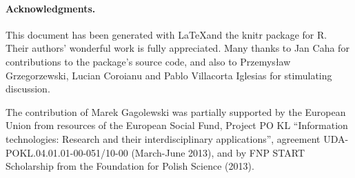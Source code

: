 \documentclass[11pt]{article}\usepackage[]{graphicx}\usepackage[]{color}
\newcommand{\package}[1]{\textsf{#1}\xspace}
\newcommand{\lang}[1]{\textsf{#1}\xspace}
\newcommand{\R}{\lang{R}}
\begin{document}
%

\paragraph{Acknowledgments.}
This document has been generated with \LaTeX and the \package{knitr}
package for \R.
Their authors' wonderful work is fully appreciated.
Many thanks to Jan Caha for contributions to the package's source code,
and also to Przemys\l{}aw Grzegorzewski, Lucian Coroianu
and Pablo Villacorta Iglesias for stimulating discussion.



The contribution of Marek Gagolewski was partially supported
by the European Union from resources of the European Social Fund, Project PO KL
``Information technologies: Research and their interdisciplinary
applications'', agreement UDA-POKL.04.01.01-00-051/10-00 (March-June 2013),
and by FNP START Scholarship from the Foundation for Polish Science (2013).



% 
% 
\end{document}
